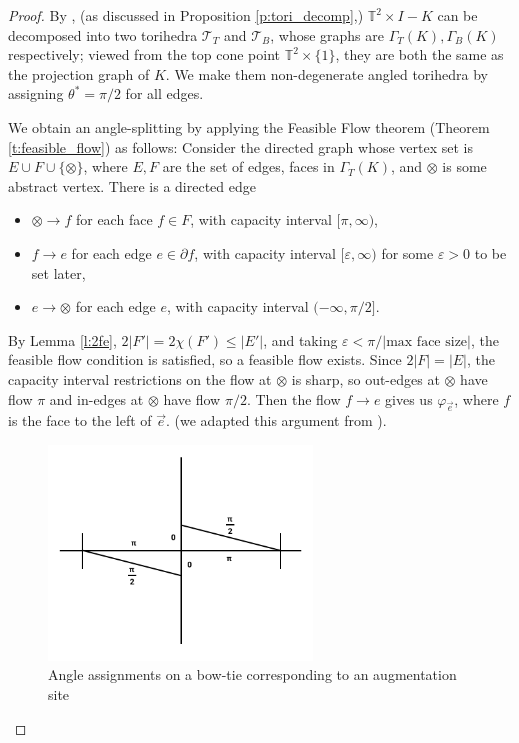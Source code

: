 \documentclass[11pt]{amsart}
\newcommand{\thmref}[1]{Theorem \ref{#1}}
\newcommand{\prpref}[1]{Proposition \ref{#1}}
\newcommand{\lemref}[1]{Lemma \ref{#1}}
\newcommand{\torus}{{\mathbb{T}^2}}
\newcommand{\sT}{{\mathcal{T}}}
\newcommand{\del}{\partial}
\newcommand{\vphi}{\varphi}
\newcommand{\veps}{\varepsilon}
\newcommand{\toruscomp}[1]{{\torus \times I - #1}}
\theoremstyle{plain}
\theoremstyle{definition}
\begin{document}
\begin{proof}
By \cite[Theorem 7.5]{CKP2},
(as discussed in \prpref{p:tori_decomp},)
$\toruscomp{K}$ can be decomposed
into two torihedra $\sT_T$ and $\sT_B$,
whose graphs are $\Gamma_T(K), \Gamma_B(K)$ respectively;
viewed from the top cone point $\torus \times \{1\}$,
they are both the same as the projection graph of $K$.
We make them non-degenerate angled torihedra by assigning $\theta^* = \pi/2$
for all edges.

We obtain an angle-splitting by applying the
Feasible Flow theorem (\thmref{t:feasible_flow}) as follows:
Consider the directed graph whose vertex set is
$E \cup F \cup \{\otimes\}$,
where $E, F$ are the set of edges, faces in $\Gamma_T(K)$,
and $\otimes$ is some abstract vertex.
There is a directed edge
\begin{itemize}
\item $\otimes \to f$ for each face $f\in F$, with capacity interval
	$[\pi, \infty)$,
\item $f \to e$ for each edge $e \in \del f$,
	with capacity interval $[\veps, \infty)$
	for some $\veps>0$ to be set later,
\item $e \to \otimes$ for each edge $e$, with capacity interval
	$(-\infty, \pi/2]$.
\end{itemize}
By \lemref{l:2fe}, $2|F'| = 2\chi(F') \leq |E'|$,
and taking $\veps < \pi / |\text{max face size}|$,
the feasible flow condition is satisfied,
so a feasible flow exists.
Since $2|F| = |E|$, the capacity interval restrictions
on the flow at $\otimes$ is sharp, so out-edges at $\otimes$
have flow $\pi$ and in-edges at $\otimes$ have flow $\pi/2$.
Then the flow $f \to e$ gives us $\vphi_{\vec{e}}$,
where $f$ is the face to the left of $\vec{e}$.
(we adapted this argument from \cite{BandS}).


\begin{figure}
\includegraphics[width=7cm]{more_pictures/horizontal_bowtie.png}
\caption{Angle assignments on a bow-tie corresponding to an augmentation site}
\label{f:bowtie_angles}
\end{figure}


\end{proof}
\end{document}
